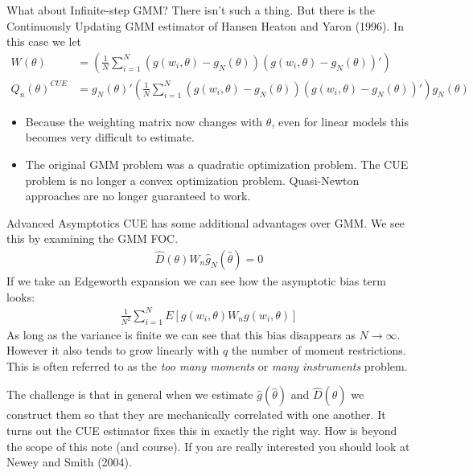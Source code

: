 \documentclass[aspectratio=169]{beamer}
\begin{document}
\begin{frame}{What about Infinite-step GMM?}
 There isn't such a thing. But there is the \alert{Continuously Updating GMM} estimator of Hansen Heaton and Yaron (1996). In this case we let \\
\begin{align*}
W(\theta)&=\left(\frac{1}{N} \sum_{i=1}^N (g(w_i,\theta) - g_N(\theta)) (g(w_i,\theta)-g_N(\theta))' \right) \\
Q_n(\theta)^{CUE} &= g_N(\theta)' \left(\frac{1}{N} \sum_{i=1}^N (g(w_i,\theta) - g_N(\theta)) (g(w_i,\theta)-g_N(\theta))' \right) g_N(\theta)
\end{align*}
\begin{itemize}
\item Because the weighting matrix now changes with $\theta$, even for linear models this becomes very difficult to estimate. 
\item The original GMM problem was a quadratic optimization problem. The CUE problem is no longer a convex optimization problem. Quasi-Newton approaches are no longer guaranteed to work.
\end{itemize}
\end{frame}

\begin{frame}{Advanced Asymptotics}
\small
CUE has some additional advantages over GMM. We see this by examining the GMM FOC. 
\begin{eqnarray*}
\hat{D}(\theta) W_n \hat{g}_N(\hat{\theta}) =0
\end{eqnarray*}
If we take an Edgeworth expansion we can see how the  \alert{asymptotic bias} term looks:
\begin{eqnarray*}
\frac{1}{N^2}\sum_{i=1}^N E[g(w_i,\theta) W_n g(w_i,\theta)]
\end{eqnarray*}
As long as the variance is finite we can see that this bias disappears as $N \rightarrow \infty$. However it also tends to grow linearly with $q$ the number of moment restrictions. This is often referred to as the \textit{too many moments} or \textit{many instruments} problem.

The challenge is that in general when we estimate $\hat{g}(\hat{\theta})$ and $\hat{D}(\hat{\theta})$ we construct them so that they are mechanically correlated with one another. It turns out the CUE estimator fixes this in exactly the right way. How is beyond the scope of this note (and course). If you are really interested you should look at Newey and Smith (2004).

\end{frame}
\end{document}
